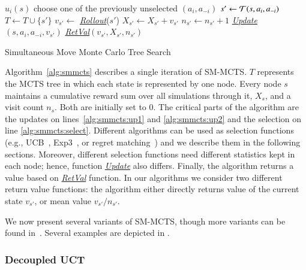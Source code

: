 \begin{algorithm2e}[t]
\small
{}
 {
	\Return $u_i(s)$
}
 {
	choose one of the previously unselected $(a_i, a_{-i})$\;
	$s' \leftarrow \mathcal{T}(s,a_i,a_{-i})$\;
	$T \leftarrow T \cup \lbrace s' \rbrace$\;
	$v_{s'} \leftarrow $ \emph{\underline{Rollout}}($s'$)\;
	$X_{s'} \leftarrow X_{s'} + v_{s'}$\;
	$n_{s'} \leftarrow n_{s'} + 1$\;
	\emph{\underline{Update}}$(s,a_i,a_{-i},v_{s'})$\;\label{alg:smmcts:up1}
	\Return \emph{\underline{RetVal}}$(v_{s'}, X_{s'}, n_{s'})$ 	
}
\caption{Simultaneous Move Monte Carlo Tree Search}\label{alg:smmcts}
\end{algorithm2e}

Algorithm~\ref{alg:smmcts} describes a single iteration of SM-MCTS. $T$ represents the MCTS tree in which
each state is represented by one node. Every node $s$ maintains a cumulative reward sum over all
simulations through it, $X_s$, and a visit count $n_s$. Both are initially set to $0$. The critical parts of the
algorithm are the updates on lines~\ref{alg:smmcts:up1} and \ref{alg:smmcts:up2} and the selection on line \ref{alg:smmcts:select}. 
Different algorithms can be used as selection functions (e.g., UCB~\cite{UCB}, Exp3~\cite{Auer2003Exp3}, or regret matching~\cite{Hart00}) 
and we describe them in the following sections. 
Moreover, different selection functions need different statistics kept in each node; hence, function \emph{\underline{Update}} also differs. 
Finally, the algorithm returns a value based on \emph{\underline{RetVal}} function. 
In our algorithms we consider two different return value functions: the algorithm either directly returns value of the current 
state $v_{s'}$, or mean value $v_{s'}/n_{s'}$.

We now present several variants of SM-MCTS, though more variants can be found 
in~\cite{Perick12Comparison,Lanctot13Tron,Tak14smmcts}. Several examples are depicted in \cite{Tak14smmcts}. 

\subsubsection{Decoupled UCT} \label{sec:duct}


